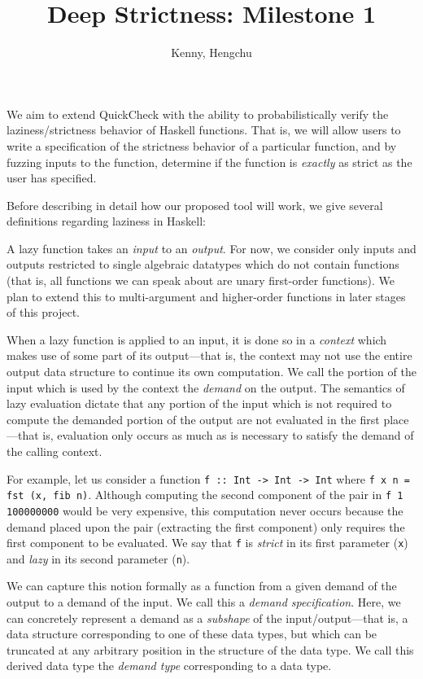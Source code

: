 \documentclass{article}
\title{Deep Strictness: Milestone 1}
\author{Kenny, Hengchu}
\begin{document}
\maketitle

We aim to extend QuickCheck with the ability to probabilistically
verify the laziness/strictness behavior of Haskell functions. That is,
we will allow users to write a specification of the strictness
behavior of a particular function, and by fuzzing inputs to the
function, determine if the function is \emph{exactly} as strict as the
user has specified.

Before describing in detail how our proposed tool will work, we give
several definitions regarding laziness in Haskell:

A lazy function takes an \emph{input} to an \emph{output}. For now, we
consider only inputs and outputs restricted to single algebraic
datatypes which do not contain functions (that is, all functions we
can speak about are unary first-order functions). We plan to extend
this to multi-argument and higher-order functions in later stages of
this project.

When a lazy function is applied to an input, it is done so in a
\emph{context} which makes use of some part of its output---that is,
the context may not use the entire output data structure to continue
its own computation. We call the portion of the input which is used by
the context the \emph{demand} on the output. The semantics of lazy
evaluation dictate that any portion of the input which is not required
to compute the demanded portion of the output are not evaluated in the
first place---that is, evaluation only occurs as much as is necessary
to satisfy the demand of the calling context.

For example, let us consider a function \verb|f :: Int -> Int -> Int| where
\verb|f x n = fst (x, fib n)|. Although computing the second component of
the pair in \verb|f 1 100000000| would be very expensive, this computation
never occurs because the demand placed upon the pair (extracting the
first component) only requires the first component to be evaluated. We
say that \verb|f| is \emph{strict} in its first parameter (\verb|x|) and
\emph{lazy} in its second parameter (\verb|n|).

We can capture this notion formally as a function from a given demand
of the output to a demand of the input. We call this a \emph{demand
  specification}. Here, we can concretely represent a demand as a
\emph{subshape} of the input/output---that is, a data structure
corresponding to one of these data types, but which can be truncated
at any arbitrary position in the structure of the data type. We call
this derived data type the \emph{demand type} corresponding to a data
type.
\end{document}
